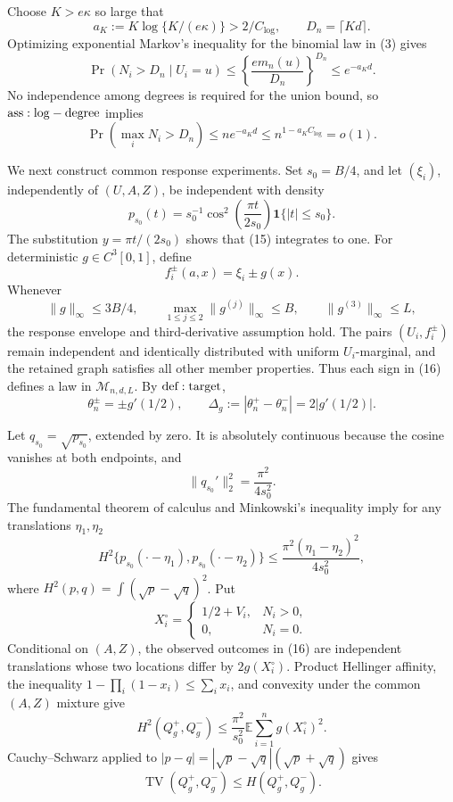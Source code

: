 Choose \(K>e\kappa\) so large that
\[
 a_K:=K\log\{K/(e\kappa)\}>2/C_{\log},
 \qquad D_n=\lceil Kd\rceil.
\tag{13}
\]
Optimizing exponential Markov's inequality for the binomial law in (3) gives
\[
 \Pr(N_i>D_n\mid U_i=u)
 \leq\left\{\frac{em_n(u)}{D_n}\right\}^{D_n}
 \leq e^{-a_Kd}.
\]
No independence among degrees is required for the union bound, so \({\rm ass:log-degree}\) implies
\[
 \Pr\left(\max_iN_i>D_n\right)\leq ne^{-a_Kd}
 \leq n^{1-a_KC_{\log}}=o(1).
\tag{14}
\]

We next construct common response experiments.  Set \(s_0=B/4\), and let \((\xi_i)\), independently of \((U,A,Z)\), be independent with density
\[
 p_{s_0}(t)=s_0^{-1}\cos^2\!\left(\frac{\pi t}{2s_0}\right)
 \mathbf1\{|t|\leq s_0\}.
\tag{15}
\]
The substitution \(y=\pi t/(2s_0)\) shows that (15) integrates to one.  For deterministic \(g\in C^3[0,1]\), define
\[
 f_i^\pm(a,x)=\xi_i\pm g(x).
\tag{16}
\]
Whenever
\[
 \|g\|_\infty\leq3B/4,
 \qquad \max_{1\leq j\leq2}\|g^{(j)}\|_\infty\leq B,
 \qquad \|g^{(3)}\|_\infty\leq L,
\tag{17}
\]
the response envelope and third-derivative assumption hold.  The pairs \((U_i,f_i^\pm)\) remain independent and identically distributed with uniform \(U_i\)-marginal, and the retained graph satisfies all other member properties.  Thus each sign in (16) defines a law in \(\mathcal M_{n,d,L}\).  By \({\rm def:target}\),
\[
 \theta_n^\pm=\pm g'(1/2),
 \qquad \Delta_g:=|\theta_n^+-\theta_n^-|=2|g'(1/2)|.
\tag{18}
\]

Let \(q_{s_0}=\sqrt{p_{s_0}}\), extended by zero.  It is absolutely continuous because the cosine vanishes at both endpoints, and
\[
 \|q_{s_0}'\|_2^2=\frac{\pi^2}{4s_0^2}.
\tag{19}
\]
The fundamental theorem of calculus and Minkowski's inequality imply for any translations \(\eta_1,\eta_2\)
\[
 H^2\{p_{s_0}(\mathord\cdot-\eta_1),p_{s_0}(\mathord\cdot-\eta_2)\}
 \leq\frac{\pi^2(\eta_1-\eta_2)^2}{4s_0^2},
\tag{20}
\]
where \(H^2(p,q)=\int(\sqrt p-\sqrt q)^2\).  Put
\[
 X_i^\circ=\begin{cases}1/2+V_i,&N_i>0,\\0,&N_i=0.\end{cases}
\]
Conditional on \((A,Z)\), the observed outcomes in (16) are independent translations whose two locations differ by \(2g(X_i^\circ)\).  Product Hellinger affinity, the inequality \(1-\prod_i(1-x_i)\leq\sum_i x_i\), and convexity under the common \((A,Z)\) mixture give
\[
 H^2(Q_g^+,Q_g^-)
 \leq\frac{\pi^2}{s_0^2}\mathbb E\sum_{i=1}^ng(X_i^\circ)^2.
\tag{21}
\]
Cauchy--Schwarz applied to \(|p-q|=|\sqrt p-\sqrt q|(\sqrt p+\sqrt q)\) gives
\[
 \operatorname{TV}(Q_g^+,Q_g^-)\leq H(Q_g^+,Q_g^-).
\tag{22}
\]

